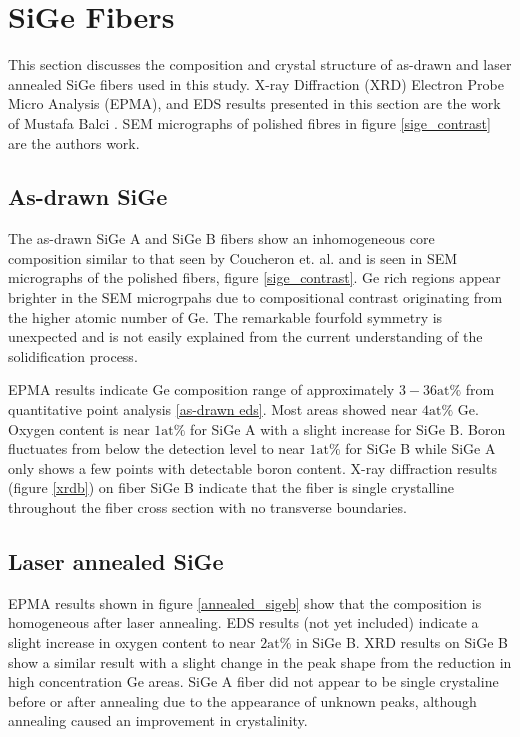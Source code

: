 
\section{SiGe Fibers}
This section discusses the composition and crystal structure of as-drawn and laser annealed SiGe fibers used in this study. X-ray Diffraction (XRD) Electron Probe Micro Analysis (EPMA), and EDS results presented in this section are the work of Mustafa Balci \cite{Balci2019FiberAnalysis}. SEM micrographs of polished fibres in figure \ref{sige_contrast} are the authors work.

\subsection{As-drawn SiGe}
The as-drawn SiGe A and SiGe B fibers show an inhomogeneous core composition similar to that seen by Coucheron et. al. \cite{Coucheron2016}  and is seen in SEM micrographs of the polished fibers, figure \ref{sige_contrast}.  Ge rich regions appear brighter in the SEM microgrpahs due to compositional contrast originating from the higher atomic number of Ge. The remarkable fourfold symmetry is unexpected and is not easily explained from the current understanding of the solidification process. 

EPMA results indicate Ge composition range of approximately $3-36 \text{at} \%$ from quantitative point analysis \ref{as-drawn eds}. Most areas showed near $4 \text{at} \%$ Ge. Oxygen content is near $1 \text{at}\%$ for SiGe A with a slight increase for SiGe B. Boron fluctuates from below the detection level to near $1 \text{at}\%$ for SiGe B while SiGe A only shows a few points with detectable boron content. X-ray diffraction results (figure \ref{xrdb}) on fiber SiGe B  indicate that the fiber is single crystalline throughout the fiber cross section with no transverse boundaries. 



\subsection{Laser annealed SiGe}
EPMA results shown in figure \ref{annealed_sigeb} show that the composition is homogeneous after laser annealing. EDS results (not yet included) indicate a slight increase in oxygen content to near $2 \text{at}\%$ in SiGe B. XRD results on SiGe B show a similar result with a slight change in the peak shape from the reduction in high concentration Ge areas. SiGe A fiber did not appear to be single crystaline before or after annealing due to the appearance of unknown peaks, although annealing caused an improvement in crystalinity. 


